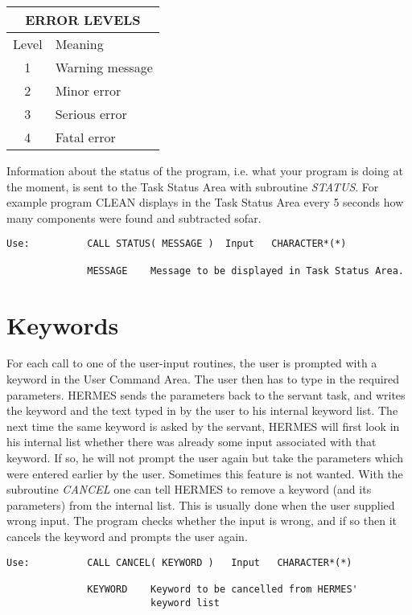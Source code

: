 \begin{center}
\begin{tabular}{|c|l|}
\hline
\multicolumn{2}{|c|}{ERROR LEVELS}\\
\hline
Level&Meaning\\
\hline
1&Warning message\\
2&Minor error\\
3&Serious error\\
4&Fatal error\\
\hline
\end{tabular}
\end{center}

Information about the status of the program, i.e.  what your program is
doing at the moment, is sent to the Task Status Area with subroutine
{\sl STATUS\/}.  For example program CLEAN displays in the Task Status
Area every 5 seconds how many components were found and subtracted
sofar.

\begin{verbatim}
Use:          CALL STATUS( MESSAGE )  Input   CHARACTER*(*)

              MESSAGE    Message to be displayed in Task Status Area.
\end{verbatim}

\section{Keywords}

For each call to one of the user-input routines, the user is prompted
with a keyword in the User Command Area.  The user then has to type in
the required parameters.  HERMES sends the parameters back to the
servant task, and writes the keyword and the text typed in by the user
to his internal keyword list.  The next time the same keyword is asked
by the servant, HERMES will first look in his internal list whether
there was already some input associated with that keyword.  If so, he
will not prompt the user again but take the parameters which were
entered earlier by the user.  Sometimes this feature is not wanted.
With the subroutine {\sl CANCEL\/} one can tell HERMES to
remove a keyword (and its parameters) from the internal list.  This is
usually done when the user supplied wrong input.  The program checks
whether the input is wrong, and if so then it cancels the keyword and
prompts the user again.

\begin{verbatim}
Use:          CALL CANCEL( KEYWORD )   Input   CHARACTER*(*)

              KEYWORD    Keyword to be cancelled from HERMES'
                         keyword list
\end{verbatim}

